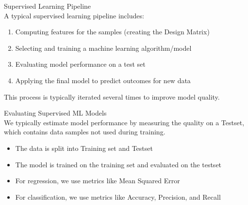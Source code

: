 \begin{concept}{Supervised Learning Pipeline}\\
A typical supervised learning pipeline includes:
\begin{enumerate}
    \item Computing features for the samples (creating the Design Matrix)
    \item Selecting and training a machine learning algorithm/model
    \item Evaluating model performance on a test set
    \item Applying the final model to predict outcomes for new data
\end{enumerate}
This process is typically iterated several times to improve model quality.
\end{concept}

\begin{definition}{Evaluating Supervised ML Models}\\
We typically estimate model performance by measuring the quality on a Testset, which contains data samples not used during training.
\begin{itemize}
    \item The data is split into Training set and Testset
    \item The model is trained on the training set and evaluated on the testset
    \item For regression, we use metrics like Mean Squared Error
    \item For classification, we use metrics like Accuracy, Precision, and Recall
\end{itemize}
\end{definition}

